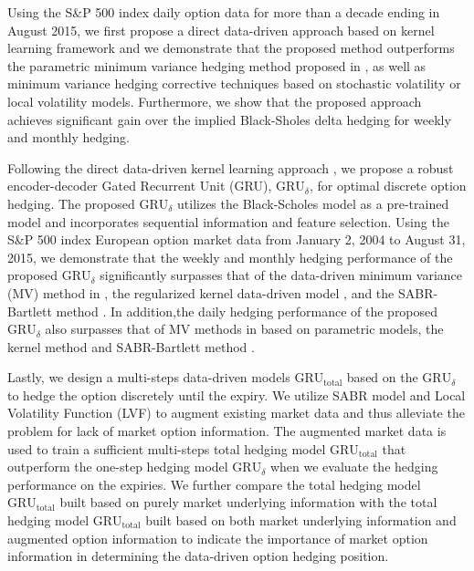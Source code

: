 Using the S\&P 500 index daily option data for more than a decade ending in August 2015, we first propose a direct data-driven approach \citep{knian2017} based on kernel learning framework and we demonstrate  that the proposed method outperforms the parametric minimum variance hedging method proposed in \citep{hulloptimal}, as well as  minimum variance hedging corrective techniques based on stochastic volatility or local volatility models.
Furthermore, we show that the proposed approach achieves significant gain over the implied Black-Sholes delta hedging for weekly and monthly hedging.

Following the direct data-driven kernel learning approach \citep{knian2017}, we propose a robust encoder-decoder  Gated Recurrent Unit (GRU), $\text{GRU}_{\delta}$, for optimal discrete option hedging. The proposed $\text{GRU}_{\delta}$ utilizes the Black-Scholes model as a pre-trained model and  incorporates sequential information and feature selection.  Using the S\&P 500 index European option market data from January 2, 2004 to August 31, 2015,   we demonstrate that the weekly and monthly hedging performance of the proposed $\text{GRU}_{\delta}$ significantly surpasses that of the data-driven minimum variance (MV) method in \citep{hulloptimal}, the regularized kernel data-driven model \citep{knian2017}, and the SABR-Bartlett method \cite{hagan2017bartlett}.
In addition,the daily hedging performance of the proposed $\text{GRU}_{\delta}$ also surpasses that of MV methods in \cite{hulloptimal} based on parametric models, the kernel method \citep{knian2017} and SABR-Bartlett method \cite{hagan2017bartlett}.

Lastly, we design a multi-steps data-driven models $\text{GRU}_{\text{total}}$ based on the $\text{GRU}_{\delta}$  to hedge the option discretely until the expiry.  We utilize SABR model and Local Volatility Function (LVF) to augment existing market data and thus alleviate the problem for lack of market option information. The augmented market data is used to train a sufficient multi-steps total hedging model $\text{GRU}_{\text{total}}$ that outperform the one-step hedging model $\text{GRU}_{\delta}$   when we evaluate the hedging performance on the expiries. We further compare the total hedging model $\text{GRU}_{\text{total}}$ built based on purely market underlying information with the total hedging model $\text{GRU}_{\text{total}}$ built based on both market underlying information and augmented option information to indicate the importance of market option information in determining the data-driven option hedging position. 
\cleardoublepage

